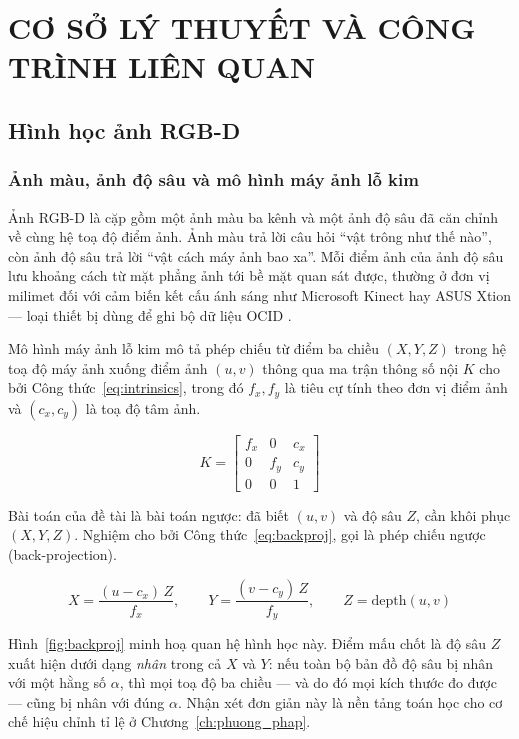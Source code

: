 \chapter{CƠ SỞ LÝ THUYẾT VÀ CÔNG TRÌNH LIÊN QUAN}
\label{ch:co_so}

\section{Hình học ảnh RGB-D}

\subsection{Ảnh màu, ảnh độ sâu và mô hình máy ảnh lỗ kim}

Ảnh RGB-D là cặp gồm một ảnh màu ba kênh và một ảnh độ sâu đã căn chỉnh về cùng hệ toạ độ điểm
ảnh. Ảnh màu trả lời câu hỏi ``vật trông như thế nào'', còn ảnh độ sâu trả lời ``vật cách máy
ảnh bao xa''. Mỗi điểm ảnh của ảnh độ sâu lưu khoảng cách từ mặt phẳng ảnh tới bề mặt quan sát
được, thường ở đơn vị milimet đối với cảm biến kết cấu ánh sáng như Microsoft Kinect hay ASUS
Xtion --- loại thiết bị dùng để ghi bộ dữ liệu OCID \cite{suchi2019ocid}.

Mô hình máy ảnh lỗ kim \cite{hartley2003multiview} mô tả phép chiếu từ điểm ba chiều
$(X, Y, Z)$ trong hệ toạ độ máy ảnh xuống điểm ảnh $(u, v)$ thông qua ma trận thông số nội $K$
cho bởi Công thức~\eqref{eq:intrinsics}, trong đó $f_x, f_y$ là tiêu cự tính theo đơn vị điểm
ảnh và $(c_x, c_y)$ là toạ độ tâm ảnh.

\begin{equation}
\label{eq:intrinsics}
K =
\begin{bmatrix}
f_x & 0   & c_x \\
0   & f_y & c_y \\
0   & 0   & 1
\end{bmatrix}
\end{equation}

Bài toán của đề tài là bài toán ngược: đã biết $(u,v)$ và độ sâu $Z$, cần khôi phục $(X,Y,Z)$.
Nghiệm cho bởi Công thức~\eqref{eq:backproj}, gọi là phép chiếu ngược (back-projection).

\begin{equation}
\label{eq:backproj}
X = \frac{(u - c_x) \, Z}{f_x}, \qquad
Y = \frac{(v - c_y) \, Z}{f_y}, \qquad
Z = \mathrm{depth}(u,v)
\end{equation}

Hình~\ref{fig:backproj} minh hoạ quan hệ hình học này. Điểm mấu chốt là độ sâu $Z$ xuất hiện
dưới dạng \emph{nhân} trong cả $X$ và $Y$: nếu toàn bộ bản đồ độ sâu bị nhân với một hằng số
$\alpha$, thì mọi toạ độ ba chiều --- và do đó mọi kích thước đo được --- cũng bị nhân với đúng
$\alpha$. Nhận xét đơn giản này là nền tảng toán học cho cơ chế hiệu chỉnh tỉ lệ ở
Chương~\ref{ch:phuong_phap}.

